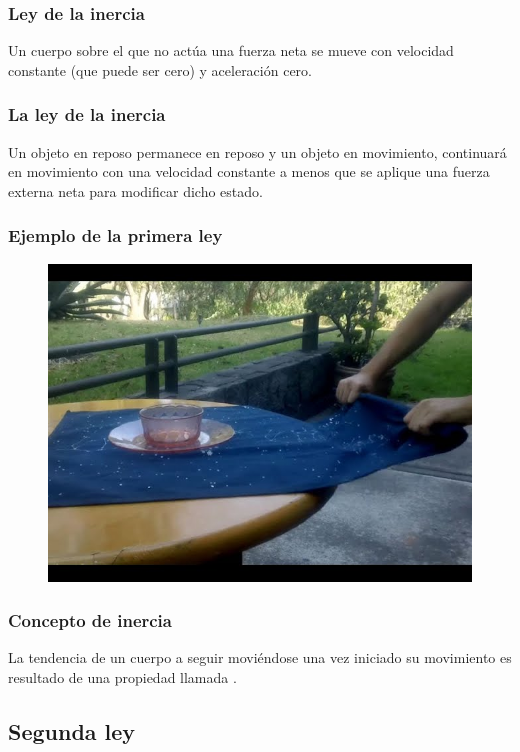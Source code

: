 \documentclass[14pt]{beamer}
\begin{document}
\begin{frame}
\frametitle{Ley de la inercia}
Un cuerpo sobre el que no actúa una fuerza neta se mueve con velocidad constante (que puede ser cero) y aceleración cero.
\end{frame}
\begin{frame}
\frametitle{La ley de la inercia}
Un objeto en reposo permanece en reposo \pause y un objeto en movimiento, continuará en movimiento con una velocidad constante \pause a menos que se aplique una fuerza externa neta para modificar dicho estado.
\end{frame}
\begin{frame}
\frametitle{Ejemplo de la primera ley}
\begin{figure}
    \centering
    \includegraphics[scale=0.35]{Imagenes/Newton_01.jpg}
\end{figure}
\end{frame}
\begin{frame}
\frametitle{Concepto de inercia}
La tendencia de un cuerpo a seguir moviéndose una vez iniciado su movimiento es resultado de una propiedad llamada .
\end{frame}

\subsection{Segunda ley}
\end{document}
